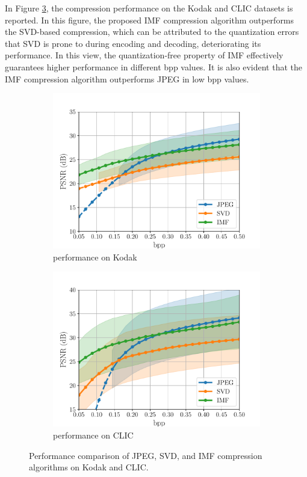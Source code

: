 In Figure \ref{fig:compression_performance_kodak_clic}, the compression performance on the Kodak and CLIC datasets is reported. 
In this figure, the proposed IMF compression algorithm outperforms the SVD-based compression, which can be attributed to the quantization errors that SVD is prone to during encoding and decoding, deteriorating its performance. In this view, the quantization-free property of IMF effectively guarantees higher performance in different bpp values.
It is also evident that the IMF compression algorithm outperforms JPEG in low bpp values.
\begin{figure}[t]
	\centering
	\begin{subfigure}{.45\textwidth}
		\centering
		\includegraphics[width=.95\textwidth]{figures/comparison_kodak_psnr.pdf}
		\caption{performance on Kodak}
		\label{fig: psnr-vs-bpp kodak}
	\end{subfigure}%
	\begin{subfigure}{.45\textwidth}
		\centering
		\includegraphics[width=.95\textwidth]{figures/comparison_clic_psnr.pdf}
		\caption{performance on CLIC}
		\label{fig: psnr-vs-bpp clic}
	\end{subfigure}
	\caption{Performance comparison of JPEG, SVD, and IMF compression algorithms on Kodak and CLIC. 
    }
	\label{fig:compression_performance_kodak_clic}
\end{figure}

